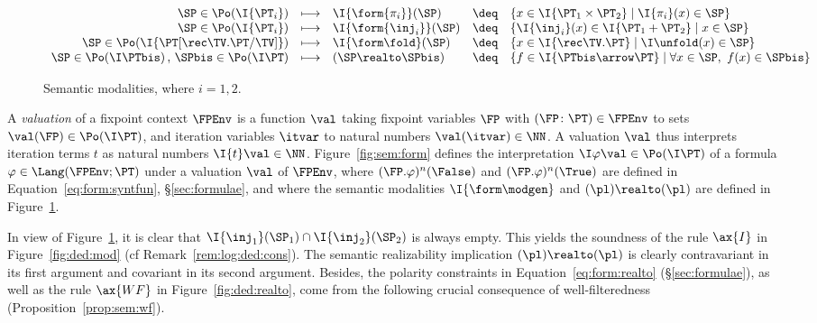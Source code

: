 \begin{figure}[t!]
\centering
\(
\begin{array}{r c l c l}
%
  \SP \in \Po(\I{\PT_i})
& \longmapsto
& \I{\form{\pi_i}}(\SP)
& \deq
& \left\{
  x \in \I{\PT_1 \times \PT_2}
  \mid
  \I{\pi_i}(x) \in \SP
  \right\}
\\
%
  \SP \in \Po(\I{\PT_i})
& \longmapsto
& \I{\form{\inj_i}}(\SP)
& \deq
& \left\{
  \I{\inj_i}(x) \in \I{\PT_1 + \PT_2}
  \mid
  x \in \SP
  \right\}
\\
%
  \SP \in \Po(\I{\PT[\rec\TV.\PT/\TV]})
& \longmapsto
& \I{\form\fold}(\SP)
& \deq
& \left\{
  x \in \I{\rec\TV.\PT}
  \mid
  \I\unfold(x) \in \SP
  \right\}
\\
%
  \SP \in \Po(\I\PTbis)
  \,,\,
  \SPbis \in \Po(\I\PT)
& \longmapsto
& (\SP \realto \SPbis)
& \deq
& \left\{
  f \in \I{\PTbis \arrow \PT}
  \mid
  \forall x \in \SP,~ f(x) \in \SPbis
  \right\}
%
\end{array}
\)
\caption{Semantic modalities, where $i = 1,2$.%
\label{fig:sem:mod}}
\end{figure}

A \emph{valuation} of a fixpoint context $\FPEnv$ is a function $\val$ taking
fixpoint variables
$\FP$ with $(\FP \colon \PT) \in \FPEnv$ to sets $\val(\FP) \in \Po(\I\PT)$,
and iteration variables $\itvar$ to natural numbers $\val(\itvar) \in \NN$.
%
A valuation $\val$ thus interprets iteration terms $t$
as natural numbers $\I{t}\val \in \NN$.
%
Figure~\ref{fig:sem:form}
defines the interpretation $\I\varphi\val \in \Po(\I\PT)$
of a formula $\varphi \in \Lang(\FPEnv; \PT)$
under a valuation $\val$ of $\FPEnv$,
where $(\FP.\varphi)^n(\False)$
and
$(\FP.\varphi)^n(\True)$
are defined in Equation~\eqref{eq:form:syntfun}, \S\ref{sec:formulae},
and where the semantic modalities $\I{\form\modgen}$ and
$(\pl) \realto (\pl)$ are defined in Figure~\ref{fig:sem:mod}.%
%
%


In view of Figure~\ref{fig:sem:mod},
it is clear that $\I{\inj_1}(\SP_1) \cap \I{\inj_2}(\SP_2)$
is always empty.
This yields the soundness of the rule $\ax{I}$ in Figure~\ref{fig:ded:mod}
(cf Remark~\ref{rem:log:ded:cons}).
The semantic realizability implication $(\pl) \realto (\pl)$ 
is clearly contravariant in its first argument and covariant
in its second argument.
Besides, the polarity constraints in Equation~\eqref{eq:form:realto}
(\S\ref{sec:formulae}),
as well as the rule $\ax{WF}$ in Figure~\ref{fig:ded:realto},
come from the following crucial consequence of well-filteredness
(Proposition~\ref{prop:sem:wf}).

